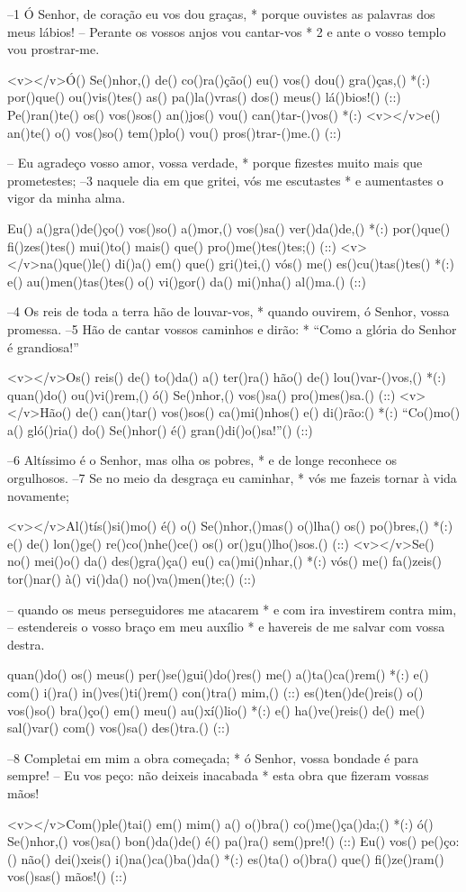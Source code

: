 –1 Ó Senhor, de coração eu vos dou graças, *
porque ouvistes as palavras dos meus lábios!
– Perante os vossos anjos vou cantar-vos *
2 e ante o vosso templo vou prostrar-me.

<v></v>Ó() Se()nhor,() de() co()ra()ção() eu() vos() dou() gra()ças,() *(:)
por()que() ou()vis()tes() as() pa()la()vras() dos() meus() lá()bios!() (::)
Pe()ran()te() os() vos()sos() an()jos() vou() can()tar-()vos() *(:)
<v></v>e() an()te() o() vos()so() tem()plo() vou() pros()trar-()me.() (::)

– Eu agradeço vosso amor, vossa verdade, *
porque fizestes muito mais que prometestes;
–3 naquele dia em que gritei, vós me escutastes *
e aumentastes o vigor da minha alma.

Eu() a()gra()de()ço() vos()so() a()mor,() vos()sa() ver()da()de,() *(:)
por()que() fi()zes()tes() mui()to() mais() que() pro()me()tes()tes;() (::)
<v></v>na()que()le() di()a() em() que() gri()tei,() vós() me() es()cu()tas()tes() *(:)
e() au()men()tas()tes() o() vi()gor() da() mi()nha() al()ma.() (::)

–4 Os reis de toda a terra hão de louvar-vos, *
quando ouvirem, ó Senhor, vossa promessa.
–5 Hão de cantar vossos caminhos e dirão: *
“Como a glória do Senhor é grandiosa!”

<v></v>Os() reis() de() to()da() a() ter()ra() hão() de() lou()var-()vos,() *(:)
quan()do() ou()vi()rem,() ó() Se()nhor,() vos()sa() pro()mes()sa.() (::)
<v></v>Hão() de() can()tar() vos()sos() ca()mi()nhos() e() di()rão:() *(:)
``Co()mo() a() gló()ria() do() Se()nhor() é() gran()di()o()sa!''() (::)

–6 Altíssimo é o Senhor, mas olha os pobres, *
e de longe reconhece os orgulhosos.
–7 Se no meio da desgraça eu caminhar, *
vós me fazeis tornar à vida novamente;

<v></v>Al()tís()si()mo() é() o() Se()nhor,()mas() o()lha() os() po()bres,() *(:)
e() de() lon()ge() re()co()nhe()ce() os() or()gu()lho()sos.() (::)
<v></v>Se() no() mei()o() da() des()gra()ça() eu() ca()mi()nhar,() *(:)
vós() me() fa()zeis() tor()nar() à() vi()da() no()va()men()te;() (::)

– quando os meus perseguidores me atacarem *
e com ira investirem contra mim,
– estendereis o vosso braço em meu auxílio *
e havereis de me salvar com vossa destra.

quan()do() os() meus() per()se()gui()do()res() me() a()ta()ca()rem() *(:)
e() com() i()ra() in()ves()ti()rem() con()tra() mim,() (::)
es()ten()de()reis() o() vos()so() bra()ço() em() meu() au()xí()lio() *(:)
e() ha()ve()reis() de() me() sal()var() com() vos()sa() des()tra.() (::)

–8 Completai em mim a obra começada; *
ó Senhor, vossa bondade é para sempre!
– Eu vos peço: não deixeis inacabada *
esta obra que fizeram vossas mãos!

<v></v>Com()ple()tai() em() mim() a() o()bra() co()me()ça()da;() *(:)
ó() Se()nhor,() vos()sa() bon()da()de() é() pa()ra() sem()pre!() (::)
Eu() vos() pe()ço:() não() dei()xeis() i()na()ca()ba()da() *(:)
es()ta() o()bra() que() fi()ze()ram() vos()sas() mãos!() (::)